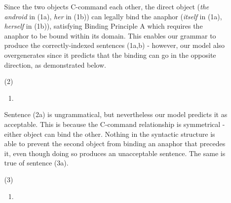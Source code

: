 \documentclass[12pt]{article}
\begin{document}
\begin{enumerate}
\begin{itemize}
Since the two objects C-command each other, the direct object (\emph{the android} in (1a), \emph{her} in (1b)) can legally bind the anaphor (\emph{itself} in (1a), \emph{herself} in (1b)), satisfying Binding Principle A which requires the anaphor to be bound within its domain. This enables our grammar to produce the correctly-indexed sentences (1a,b) - however, our model also overgenerates since it predicts that the binding can go in the opposite direction, as demonstrated below.

\pagebreak
{}
\item[(2)]
\begin{enumerate}[label=\alph*.]
\item \leavevmode\vadjust{\vspace{-\baselineskip}}\newline
{}

\end{enumerate}

Sentence (2a) is ungrammatical, but nevertheless our model predicts it as acceptable. This is because the C-command relationship is symmetrical - either object can bind the other. Nothing in the syntactic structure is able to prevent the second object from binding an anaphor that precedes it, even though doing so produces an unacceptable sentence. The same is true of sentence (3a).

\pagebreak
{}
\item[(3)]
\begin{enumerate}[label=\alph*.]
\item \leavevmode\vadjust{\vspace{-\baselineskip}}\newline
{}\\


\end{enumerate}
\end{itemize}
\end{enumerate}
\end{document}
